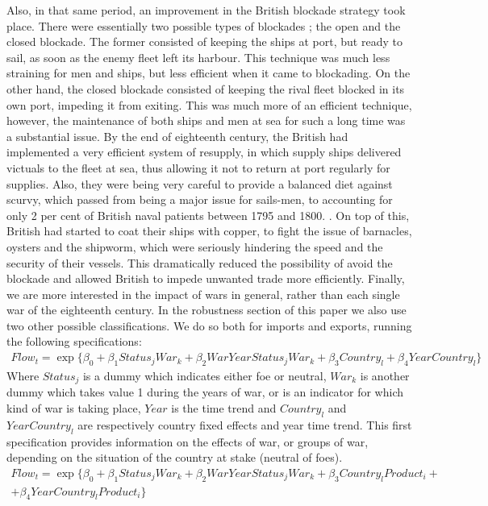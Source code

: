 \documentclass[12pt,a4paper,notitlepage,english]{article}
\begin{document}
Also, in that same period, an improvement in the British blockade strategy took place. There were essentially two possible types of blockades \citep{rainerdevelopment}; the open and the closed blockade. The former consisted of keeping the ships at port, but ready to sail, as soon as the enemy fleet left its harbour. This technique was much less straining for men and ships, but less efficient when it came to blockading. On the other hand, the closed blockade consisted of keeping the rival fleet blocked in its own port, impeding it from exiting. This was much more of an efficient technique, however, the maintenance of both ships and men at sea for such a long time was a substantial issue. By the end of eighteenth century, the British had implemented a very efficient system of resupply, in which supply ships delivered victuals to the fleet at sea, thus allowing it not to return at port regularly for supplies. Also, they were being very careful to provide a balanced diet against scurvy, which passed from being a major issue for sails-men, to accounting for only 2 per cent of British naval patients between 1795 and 1800. \citep{rodger2005command}. On top of this, British had started to coat their ships with copper, to fight the issue of barnacles, oysters and the shipworm, which were seriously hindering the speed and the security of their vessels. This dramatically reduced the possibility of avoid the blockade and allowed British to impede unwanted trade more efficiently. 
Finally, we are more interested in the impact of wars in general, rather than each single war of the eighteenth century. 
In the robustness section of this paper we also use two other possible classifications. We do so both for imports and exports, running the following specifications: 
\begin{multline}\label{eq:1}
Flow_{t}=\exp\{\beta_0+\beta_1Status_jWar_k + \beta_2WarYearStatus_jWar_k+\beta_3Country_l +\beta_4YearCountry_l\}
\end{multline}
Where $Status_j$ is a dummy which indicates either foe or neutral, $War_k$ is another dummy which takes value 1 during the years of war, or is an indicator for which kind of war is taking place, $Year$ is the time trend and $Country_l$ and $YearCountry_l$ are respectively country fixed effects and year time trend. This first specification provides information on the effects of war, or groups of war, depending on the situation of the country at stake (neutral of foes). 
\begin{multline}\label{eq:2}
Flow_{t}=\exp\{\beta_0+\beta_1Status_jWar_k + \beta_2WarYearStatus_jWar_k+\beta_3Country_lProduct_i +\\ +\beta_4YearCountry_lProduct_i\}
\end{multline}
\end{document}
